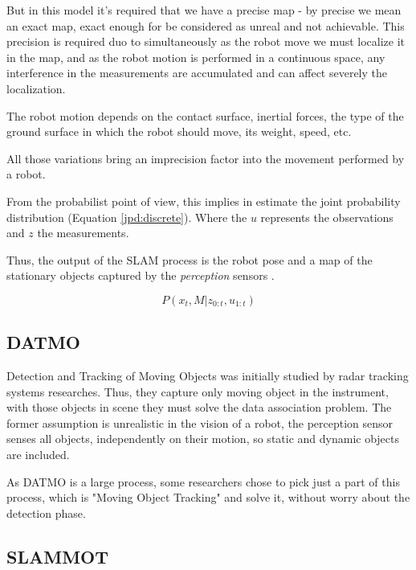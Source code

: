 But in this model it's required that we have a precise map - by precise we mean an exact map, exact enough for be considered as unreal and not achievable. This precision is required duo to simultaneously as the robot move we must localize it in the map, and as the robot motion is performed in a continuous space, any interference in the measurements are accumulated and can affect severely the localization.

The robot motion depends on the contact surface, inertial forces, the type of the ground surface in which the robot should move, its weight, speed, etc.

All those variations bring an imprecision factor into the movement performed by a robot.

From the probabilist point of view, this implies in estimate the joint probability distribution (Equation \ref{jpd:discrete}). Where the $u$ represents the observations and $z$ the measurements.

Thus, the output of the SLAM process is the robot pose and a map of the stationary objects captured by the \textit{perception} sensors \cite{iyengar1991autonomous}.


\begin{equation}
\label{jpd:discrete}
P(x_t,M | z_{0:t}, u_{1:t})
\end{equation}


\subsection{DATMO}

Detection and Tracking of Moving Objects was initially studied by radar tracking systems \cite{VU-2009-454238} researches. Thus, they capture only moving object in the instrument, with those objects in scene they must solve the data association problem. The former assumption is unrealistic in the vision of a robot, the perception sensor senses all objects, independently on their motion, so static and dynamic objects are included.

As DATMO is a large process, some researchers chose to pick just a part of this process, which is "Moving Object Tracking" and solve it, without worry about the detection phase.

\subsection{SLAMMOT}

